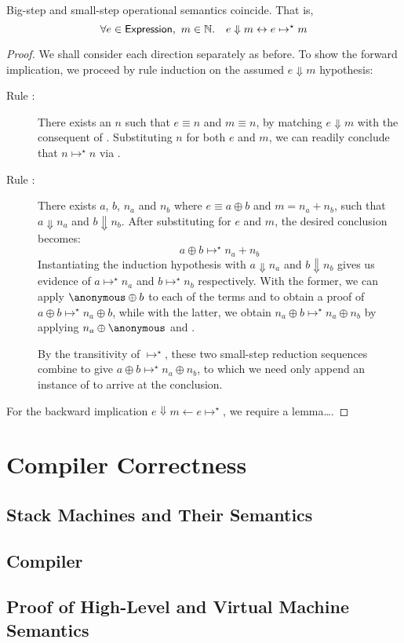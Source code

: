\begin{theorem}
Big-step and small-step operational semantics coincide. That is,
\[
	\forall e \in \mathsf{Expression},\ m \in \mathbb{N}.\quad
		e \Downarrow m \leftrightarrow e \mapsto^\star m
\]
\end{theorem}
\begin{proof}
We shall consider each direction separately as before. To show the forward
implication, we proceed by rule induction on the assumed $e \Downarrow m$
hypothesis:
\begin{description}
\item[Rule :]%
There exists an $n$ such that $e \equiv n$ and $m \equiv n$, by matching $e
\Downarrow m$ with the consequent of . Substituting $n$ for
both $e$ and $m$, we can readily conclude that $n \mapsto^\star n$ via
.
\item[Rule :]%
There exists $a$, $b$, $n_a$ and $n_b$ where $e \equiv a \oplus b$ and $m
= n_a + n_b$, such that $a \Downarrow n_a$ and $b \Downarrow n_b$. After
substituting for $e$ and $m$, the desired conclusion becomes:
\[
	a \oplus b \mapsto^\star n_a + n_b
\]
Instantiating the induction hypothesis with $a \Downarrow n_a$ and $b
\Downarrow n_b$ gives us evidence of $a \mapsto^\star n_a$ and $b
\mapsto^\star n_b$ respectively. With the former, we can apply $\anonymous
\oplus b$ to each of the terms and  to obtain a proof of
$a \oplus b \mapsto^\star n_a \oplus b$, while with the latter, we obtain
$n_a \oplus b \mapsto^\star n_a \oplus n_b$ by applying $n_a \oplus
\anonymous$ and .

By the transitivity of $\mapsto^\star$, these two small-step reduction
sequences combine to give $a \oplus b \mapsto^\star n_a \oplus n_b$, to
which we need only append an instance of  to arrive at
the conclusion.
\end{description}

For the backward implication $e \Downarrow m \leftarrow e \mapsto^\star$, we
require a lemma\ldots .

\end{proof}




\section{Compiler Correctness}%

\subsection{Stack Machines and Their Semantics}%


\subsection{Compiler}%


\subsection{Proof of High-Level and Virtual Machine Semantics}%




